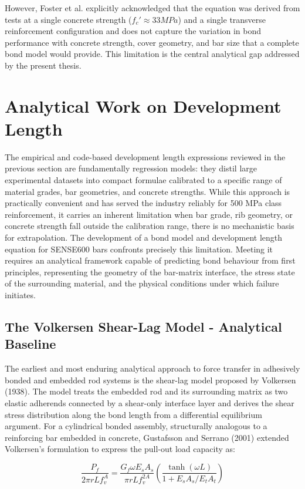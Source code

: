 However, Foster et al. explicitly acknowledged that the equation was derived from tests at a single concrete strength ($f_{c}\prime  \approx 33 MPa$) and a single transverse reinforcement configuration and does not capture the variation in bond performance with concrete strength, cover geometry, and bar size that a complete bond model would provide. This limitation is the central analytical gap addressed by the present thesis.

\section{Analytical Work on Development Length}

The empirical and code-based development length expressions reviewed in the previous section are fundamentally regression models: they distil large experimental datasets into compact formulae calibrated to a specific range of material grades, bar geometries, and concrete strengths. While this approach is practically convenient and has served the industry reliably for 500 MPa class reinforcement, it carries an inherent limitation when bar grade, rib geometry, or concrete strength fall outside the calibration range, there is no mechanistic basis for extrapolation. The development of a bond model and development length equation for SENSE600 bars confronts precisely this limitation. Meeting it requires an analytical framework capable of predicting bond behaviour from first principles, representing the geometry of the bar-matrix interface, the stress state of the surrounding material, and the physical conditions under which failure initiates.

\subsection{The Volkersen Shear-Lag Model - Analytical Baseline}
The earliest and most enduring analytical approach to force transfer in adhesively bonded and embedded rod systems is the shear-lag model proposed by Volkersen (1938). The model treats the embedded rod and its surrounding matrix as two elastic adherends connected by a shear-only interface layer and derives the shear stress distribution along the bond length from a differential equilibrium argument. For a cylindrical bonded assembly, structurally analogous to a reinforcing bar embedded in concrete, Gustafsson and Serrano (2001) extended Volkersen's formulation to express the pull-out load capacity as:

\begin{equation}
    \frac{P_{f}}{2\pi rLf_{v}^{A}}=\frac{G_{f}\omega E_{s}A_{s}}{\pi rLf_{v}^{2A}}\left(\frac{\tanh{\left(\omega L\right)}}{1+E_{s}A_{s}/E_{t}A_{t}}\right)
\end{equation}

